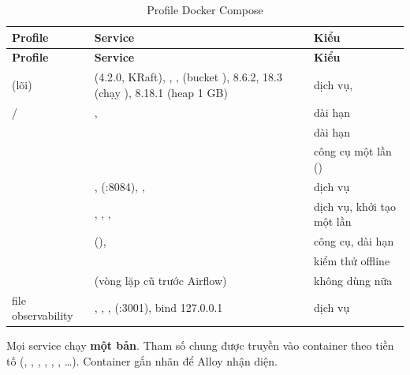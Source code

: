 \begin{xltabular}{\linewidth}{@{}L{32mm}Y L{30mm}@{}}
  \caption{Profile Docker Compose}\label{tab:profiles}\\
  \toprule
  \textbf{Profile} & \textbf{Service} & \textbf{Kiểu} \\
  \midrule
  \endfirsthead
  \toprule \textbf{Profile} & \textbf{Service} & \textbf{Kiểu} \\ \midrule
  \endhead
  {}(lõi) &  (4.2.0, KRaft), , ,  (bucket ),  8.6.2,  18.3 (chạy ),  8.18.1 (heap 1 GB) & dịch vụ,  \\
   /  & ,  & dài hạn \\
   &  & dài hạn \\
   &  & công cụ một lần () \\
   & ,  (:8084), ,  & dịch vụ \\
   & , , ,  & dịch vụ, khởi tạo một lần \\
   &  (),  & công cụ, dài hạn \\
   &  & kiểm thử offline \\
   &  (vòng lặp cũ trước Airflow) & không dùng nữa \\
  file observability & , , ,  (:3001), bind 127.0.0.1 & dịch vụ \\
  \bottomrule
\end{xltabular}

Mọi service chạy \textbf{một bản}. Tham số chung được truyền vào container theo tiền tố (, , ,
, , , \ldots). Container gắn nhãn  để Alloy nhận diện.

